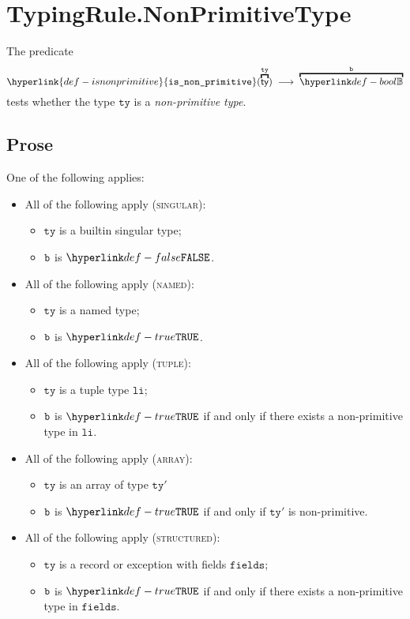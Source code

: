 \documentclass{book}
\newcommand\isnonprimitive[0]{\hyperlink{def-isnonprimitive}{\texttt{is\_non\_primitive}}}
\newcommand\tty[0]{\texttt{ty}}
\newcommand\fields[0]{\texttt{fields}}
\newcommand\vli[0]{\texttt{li}}
\begin{document}
\section{TypingRule.NonPrimitiveType \label{sec:TypingRule.NonPrimitiveType}}
\hypertarget{def-isnonprimitive}{}
The predicate
\[
  \isnonprimitive(\overname{\ty}{\tty}) \;\aslto\; \overname{\Bool}{\vb}
\]
tests whether the type $\tty$ is a \emph{non-primitive type}.

\subsection{Prose}
One of the following applies:
\begin{itemize}
  \item All of the following apply (\textsc{singular}):
  \begin{itemize}
  \item $\tty$ is a builtin singular type;
  \item $\texttt{b}$ is $\False$.
  \end{itemize}
  \item All of the following apply (\textsc{named}):
  \begin{itemize}
    \item $\tty$ is a named type;
    \item $\texttt{b}$ is $\True$.
  \end{itemize}
  \item All of the following apply (\textsc{tuple}):
  \begin{itemize}
    \item $\tty$ is a tuple type $\vli$;
    \item $\texttt{b}$ is $\True$ if and only if there exists a non-primitive type in $\vli$.
  \end{itemize}
  \item All of the following apply (\textsc{array}):
    \begin{itemize}
    \item $\tty$ is an array of type $\tty'$
    \item $\texttt{b}$ is $\True$ if and only if $\tty'$ is non-primitive.
    \end{itemize}
  \item All of the following apply (\textsc{structured}):
    \begin{itemize}
    \item $\tty$ is a record or exception with fields $\fields$;
    \item $\texttt{b}$ is $\True$ if and only if there exists a non-primitive type in $\fields$.
    \end{itemize}
\end{itemize}
\end{document}
